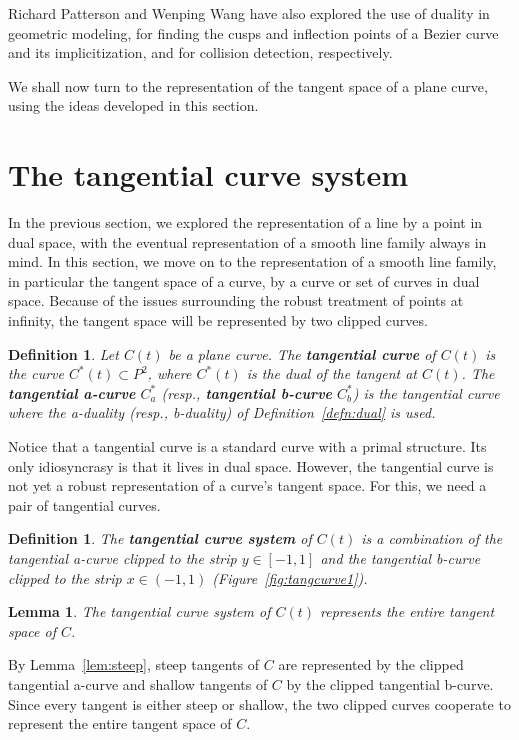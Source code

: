 \documentclass[12pt]{article}
\newcommand{\QED}{\vrule height 1.4ex width 1.0ex depth -.1ex\ \vspace{.3in}} %
\newcommand{\prf}{\noindent{{\bf Proof}:\ \ \ }}
\newtheorem{lemma}[theorem]{Lemma}
\newtheorem{defn2}[theorem]{Definition}
\begin{document}
Richard Patterson \cite{patterson01} and Wenping Wang \cite{wenping01}
have also explored the use of duality in geometric modeling,
for finding the cusps and inflection points of a Bezier curve and its implicitization,
and for collision detection, respectively.

We shall now turn to the representation of the tangent space of a plane curve,
using the ideas developed in this section.


\section{The tangential curve system}
\label{sec:tangcurve}

In the previous section, we explored the representation of a line
by a point in dual space, with the eventual representation of a smooth line family
always in mind.
In this section, we move on to the representation of a smooth line family,
in particular the tangent space of a curve, by a curve or set of curves in dual space.
Because of the issues surrounding the robust treatment of points at infinity,
the tangent space will be represented by two clipped curves.

\begin{defn2}
\label{defn:tangentialcurve}
Let $C(t)$ be a plane curve.
The {\bf tangential curve} of $C(t)$ is the curve $C^*(t) \subset P^2$,
where $C^*(t)$ is the dual of the tangent at $C(t)$.
The {\bf tangential a-curve} $C^*_a$ (resp., {\bf tangential b-curve} $C^*_b$)
is the tangential curve where the a-duality (resp., b-duality) of 
Definition~\ref{defn:dual} is used.
\end{defn2}

Notice that a tangential curve is a standard curve with a primal
structure.
Its only idiosyncrasy is that it lives in dual space.
However, the tangential curve is not yet a robust representation
of a curve's tangent space.
For this, we need a pair of tangential curves.

\begin{defn2}
\label{defn:tangentialsystem}
The {\bf tangential curve system} of $C(t)$ is a combination of
the tangential a-curve clipped to the strip $y \in [-1,1]$ and 
the tangential b-curve clipped to the strip $x \in (-1,1)$
(Figure~\ref{fig:tangcurve1}).
\end{defn2}

\begin{lemma}
The tangential curve system of $C(t)$ represents the entire tangent space of $C$.
\end{lemma}
\prf
By Lemma~\ref{lem:steep}, 
steep tangents of $C$ are represented by the clipped tangential a-curve and
shallow tangents of $C$ by the clipped tangential b-curve.
Since every tangent is either steep or shallow, the two clipped curves
cooperate to represent the entire tangent space of $C$.
\QED
\end{document}
